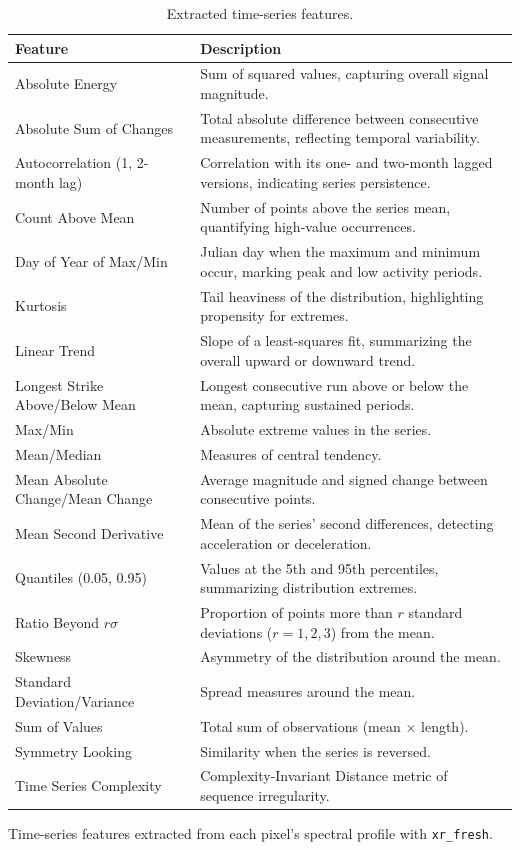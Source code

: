 \documentclass[pdflatex,sn-mathphys]{sn-jnl} %
\begin{document}
\begin{table}[htbp]
\centering
\small
\caption{Extracted time-series features.}
\label{tab:features}
\renewcommand{\arraystretch}{1.15}
\begin{tabular}{@{}>{\raggedright\arraybackslash}p{}p{}@{}}
\toprule
\textbf{Feature} & \textbf{Description} \\
\midrule
Absolute Energy & Sum of squared values, capturing overall signal magnitude. \\
Absolute Sum of Changes & Total absolute difference between consecutive measurements, reflecting temporal variability. \\
Autocorrelation (1, 2-month lag) & Correlation with its one- and two-month lagged versions, indicating series persistence. \\
Count Above Mean & Number of points above the series mean, quantifying high-value occurrences. \\
Day of Year of Max/Min & Julian day when the maximum and minimum occur, marking peak and low activity periods. \\
Kurtosis & Tail heaviness of the distribution, highlighting propensity for extremes. \\
Linear Trend & Slope of a least-squares fit, summarizing the overall upward or downward trend. \\
Longest Strike Above/Below Mean & Longest consecutive run above or below the mean, capturing sustained periods. \\
Max/Min & Absolute extreme values in the series. \\
Mean/Median & Measures of central tendency. \\
Mean Absolute Change/Mean Change & Average magnitude and signed change between consecutive points. \\
Mean Second Derivative & Mean of the series' second differences, detecting acceleration or deceleration. \\
Quantiles (0.05, 0.95) & Values at the 5th and 95th percentiles, summarizing distribution extremes. \\
Ratio Beyond \(r\sigma\) & Proportion of points more than \(r\) standard deviations ($r=1,2,3$) from the mean. \\
Skewness & Asymmetry of the distribution around the mean. \\
Standard Deviation/Variance & Spread measures around the mean. \\
Sum of Values & Total sum of observations (mean $\times$ length). \\
Symmetry Looking & Similarity when the series is reversed. \\
Time Series Complexity & Complexity-Invariant Distance metric of sequence irregularity. \\
\bottomrule
\end{tabular}

\par\vspace{4pt}
{\footnotesize Time-series features extracted from each pixel's spectral profile with \texttt{xr\_fresh}.\par}
\end{table}
\end{document}
